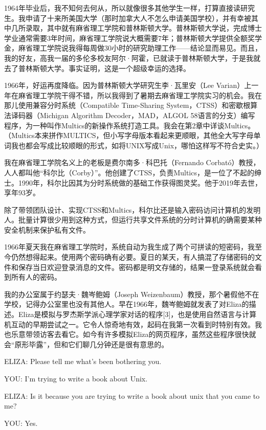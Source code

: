 \documentclass[a4paper,12pt,UTF8,twoside]{ctexbook}
\begin{document}
1964年毕业后，我不知何去何从，所以就像很多其他学生一样，打算直接读研究生。我申请了十来所美国大学（那时加拿大人不怎么申请美国学校），并有幸被其中几所录取，其中就有麻省理工学院和普林斯顿大学。普林斯顿大学说，完成博士学业通常需要3年时间，麻省理工学院说大概需要7年；普林斯顿大学提供全额奖学金，麻省理工学院说我得每周做30小时的研究助理工作——结论显而易见。而且，我的好友，高我一届的多伦多校友阿尔·阿霍，已就读于普林斯顿大学，于是我就去了普林斯顿大学。事实证明，这是一个超级幸运的选择。

1966年，好运再度降临。因为普林斯顿大学研究生李·瓦里安（Lee Varian）上一年在麻省理工学院干得不错，所以我得到了暑期去麻省理工学院实习的机会。我在那儿使用兼容分时系统（Compatible Time-Sharing System，CTSS）和密歇根算法译码器（Michigan Algorithm Decoder，MAD，ALGOL 58语言的分支）编写程序，为一种叫作Multics的新操作系统打造工具。我会在第2章中详谈Multics。（Multics本来拼作MULTICS，但小写字母版本看起来更顺眼，其他全大写字母单词我也都会写成比较顺眼的形式，如将UNIX写成Unix，哪怕这样写不符合史实。）

我在麻省理工学院名义上的老板是费尔南多·科巴托（Fernando Corbató）教授，人人都叫他“科尔比（Corby）”。他创建了CTSS，负责Multics，是一位了不起的绅士。1990年，科尔比因其为分时系统做的基础工作获得图灵奖。他于2019年去世，享年93岁。

除了带领团队设计、实现CTSS和Multics，科尔比还是输入密码访问计算机的发明人。批量计算很少用到这种方式，但运行共享文件系统的分时计算机的确需要某种安全机制来保护私有文件。

1966年夏天我在麻省理工学院时，系统自动为我生成了两个可拼读的短密码，我至今仍然想得起来。使用两个密码确有必要。夏日的某天，有人搞混了存储密码的文件和保存当日欢迎登录消息的文件。密码都是明文存储的，结果一登录系统就会看到所有人的密码。

我的办公室属于约瑟夫·魏岑鲍姆（Joseph Weizenbaum）教授，那个暑假他不在学校，记得办公室里也没有其他人。早在1966年，魏岑鲍姆就发表了对Eliza的描述。Eliza是模拟与罗杰斯学派心理学家对话的程序[3]，也是使用自然语言与计算机互动的早期尝试之一。它令人惊奇地有效，起码在我第一次看到时特别有效。我也乐意带领访客去看它。如今有许多模拟Eliza的网页程序，虽然这些程序很快就会“原形毕露”，但和它们聊几分钟还是很有意思的。

ELIZA: Please tell me what’s been bothering you.

YOU: I’m trying to write a book about Unix.

ELIZA: Is it because you are trying to write a book about unix that you came to me?

YOU: Yes.
\end{document}
